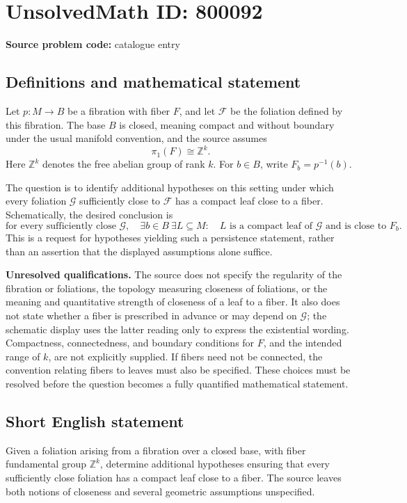 \documentclass[11pt]{article}
\begin{document}
\section*{UnsolvedMath ID: 800092}
\textbf{Source problem code:} catalogue entry
\subsection{Definitions and mathematical statement}
Let \(p\colon M\to B\) be a fibration with fiber \(F\), and let \(\mathcal F\) be the foliation defined by this fibration. The base \(B\) is closed, meaning compact and without boundary under the usual manifold convention, and the source assumes
\[
\pi_1(F)\cong\mathbb Z^k.
\]
Here \(\mathbb Z^k\) denotes the free abelian group of rank \(k\). For \(b\in B\), write \(F_b=p^{-1}(b)\).

The question is to identify additional hypotheses on this setting under which every foliation \(\mathcal G\) sufficiently close to \(\mathcal F\) has a compact leaf close to a fiber. Schematically, the desired conclusion is
\[
\text{for every sufficiently close }\mathcal G,\quad
\exists b\in B\ \exists L\subseteq M:\quad
L\text{ is a compact leaf of }\mathcal G
\text{ and is close to }F_b.
\]
This is a request for hypotheses yielding such a persistence statement, rather than an assertion that the displayed assumptions alone suffice.

\textbf{Unresolved qualifications.} The source does not specify the regularity of the fibration or foliations, the topology measuring closeness of foliations, or the meaning and quantitative strength of closeness of a leaf to a fiber. It also does not state whether a fiber is prescribed in advance or may depend on \(\mathcal G\); the schematic display uses the latter reading only to express the existential wording. Compactness, connectedness, and boundary conditions for \(F\), and the intended range of \(k\), are not explicitly supplied. If fibers need not be connected, the convention relating fibers to leaves must also be specified. These choices must be resolved before the question becomes a fully quantified mathematical statement.
\subsection{Short English statement}
Given a foliation arising from a fibration over a closed base, with fiber fundamental group \(\mathbb Z^k\), determine additional hypotheses ensuring that every sufficiently close foliation has a compact leaf close to a fiber. The source leaves both notions of closeness and several geometric assumptions unspecified.
\end{document}
